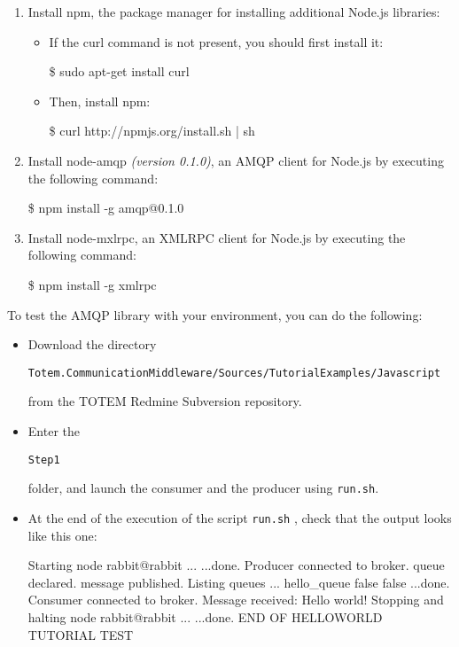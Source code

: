 \begin{enumerate}
\item Install \textsf{npm}, the package manager for installing additional 
\textsf{Node.js} libraries:
\begin{itemize}
\item If the \textsf{curl} command is not present, you should first install it:
\begin{shellcmd}
\$ sudo apt-get install curl
\end{shellcmd}
\item Then, install \textsf{npm}:
\begin{shellcmd}
\$ curl http://npmjs.org/install.sh | sh
\end{shellcmd}
\end{itemize}

\item Install \textsf{node-amqp} \textit{(version 0.1.0)}, an AMQP client for \textsf{Node.js} by 
executing the following command:
\begin{shellcmd}
\$ npm install -g amqp@0.1.0
\end{shellcmd}

\item Install \textsf{node-mxlrpc}, an XMLRPC client for \textsf{Node.js} by 
executing the following command:
\begin{shellcmd}
\$ npm install -g xmlrpc
\end{shellcmd}
\end{enumerate}

To test the AMQP library with your environment, you can do the following:
\begin{itemize}
\item Download the
  directory \begin{small}\texttt{Totem.CommunicationMiddleware/Sources/TutorialExamples/Javascript}\end{small}
  from the TOTEM Redmine Subversion repository.
\item Enter the \begin{small}\texttt{Step1}\end{small} folder, and launch 
the consumer and the producer using \texttt{run.sh}.\bigskip 
\item At the end of the execution of the script \texttt{run.sh} ,
  check that the output looks like this one:
\begin{shellcmd}
[...]
Starting node rabbit@rabbit ...
...done.
Producer connected to broker.
queue declared.
message published.
Listing queues ...
hello_queue	false	false
...done.
Consumer connected to broker.
Message received: Hello world!
Stopping and halting node rabbit@rabbit ...
...done.
END OF HELLOWORLD TUTORIAL TEST
\end{shellcmd}
\end{itemize}

\endinput
